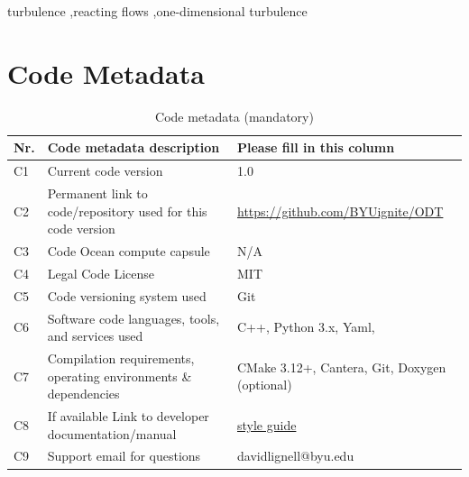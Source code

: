 \documentclass[preprint,12pt, a4paper]{elsarticle}
\begin{document}
\begin{frontmatter}
\begin{keyword}
turbulence \sep reacting flows \sep one-dimensional turbulence



\end{keyword}

\end{frontmatter}

\section*{Code Metadata}
\label{metadata}

\begin{table}[H]
\begin{tabular}{|l|p{6.5cm}|p{6.5cm}|}
\hline
\textbf{Nr.} & \textbf{Code metadata description} & \textbf{Please fill in this column} \\
\hline
C1 & Current code version & 1.0 \\
\hline
C2 & Permanent link to code/repository used for this code version & \href{https://github.com/BYUignite/ODT}{https://github.com/BYUignite/ODT} \\
\hline
C3 & Code Ocean compute capsule & N/A\\
\hline
C4 & Legal Code License   & MIT \\
\hline
C5 & Code versioning system used & Git \\
\hline
C6 & Software code languages, tools, and services used & C++, Python 3.x, Yaml,  \\
\hline
C7 & Compilation requirements, operating environments \& dependencies & CMake 3.12+, Cantera, Git, Doxygen (optional) \\
\hline
C8 & If available Link to developer documentation/manual & \href{https://byuignite.github.io/ODT/doxygen/html/style_guide.html}{style guide} \\
\hline
C9 & Support email for questions & davidlignell@byu.edu \\
\hline
\end{tabular}
\caption{Code metadata (mandatory)}
\end{table}


\linenumbers
\end{document}
